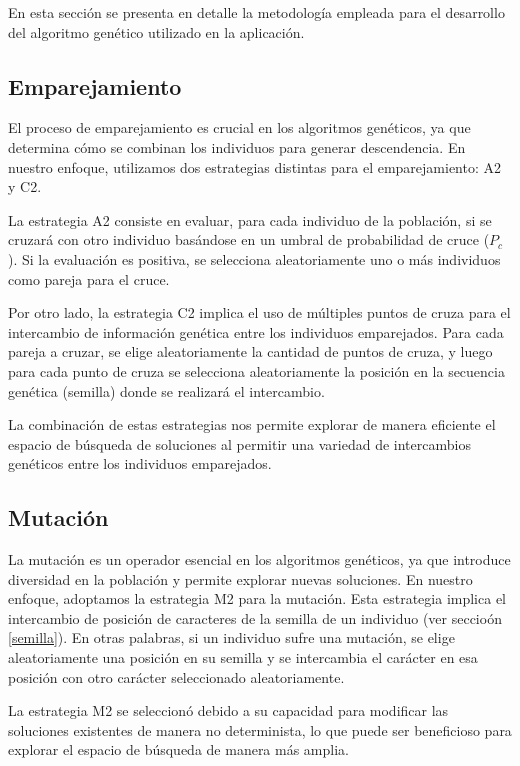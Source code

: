 En esta sección se presenta en detalle la metodología empleada para el desarrollo del algoritmo genético utilizado en la aplicación.

\subsection{Emparejamiento} \label{emparejamiento}

El proceso de emparejamiento es crucial en los algoritmos genéticos, ya que determina cómo se combinan los individuos para generar descendencia. En nuestro enfoque, utilizamos dos estrategias distintas para el emparejamiento: A2 y C2.

La estrategia A2 consiste en evaluar, para cada individuo de la población, si se cruzará con otro individuo basándose en un umbral de probabilidad de cruce ($P_c$). Si la evaluación es positiva, se selecciona aleatoriamente uno o más individuos como pareja para el cruce.

Por otro lado, la estrategia C2 implica el uso de múltiples puntos de cruza para el intercambio de información genética entre los individuos emparejados. Para cada pareja a cruzar, se elige aleatoriamente la cantidad de puntos de cruza, y luego para cada punto de cruza se selecciona aleatoriamente la posición en la secuencia genética (semilla) donde se realizará el intercambio.

La combinación de estas estrategias nos permite explorar de manera eficiente el espacio de búsqueda de soluciones al permitir una variedad de intercambios genéticos entre los individuos emparejados.

\subsection{Mutación} \label{mutacion}

La mutación es un operador esencial en los algoritmos genéticos, ya que introduce diversidad en la población y permite explorar nuevas soluciones. En nuestro enfoque, adoptamos la estrategia M2 para la mutación. Esta estrategia implica el intercambio de posición de caracteres de la semilla de un individuo (ver seccioón \ref{semilla}). En otras palabras, si un individuo sufre una mutación, se elige aleatoriamente una posición en su semilla y se intercambia el carácter en esa posición con otro carácter seleccionado aleatoriamente.

La estrategia M2 se seleccionó debido a su capacidad para modificar las soluciones existentes de manera no determinista, lo que puede ser beneficioso para explorar el espacio de búsqueda de manera más amplia.

